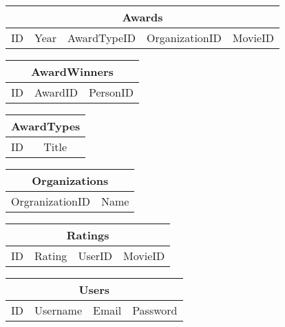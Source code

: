 \begin{tabular}{|l|l|l|l|l|}
\hline
\multicolumn{5}{|c|}{Awards} \\ \hline
ID & Year & AwardTypeID & OrganizationID & MovieID \\ \hline
\end{tabular}

\begin{tabular}{|l|l|l|}
\hline
\multicolumn{3}{|c|}{AwardWinners} \\ \hline
ID & AwardID & PersonID \\ \hline
\end{tabular}

\begin{tabular}{|l|l|}
\hline
\multicolumn{2}{|c|}{AwardTypes} \\ \hline
ID & Title \\ \hline
\end{tabular}

\begin{tabular}{|l|l|}
\hline
\multicolumn{2}{|c|}{Organizations} \\ \hline
OrgranizationID & Name \\ \hline
\end{tabular}

\begin{tabular}{|l|l|l|l|}
\hline
\multicolumn{4}{|c|}{Ratings} \\ \hline
ID & Rating & UserID & MovieID \\ \hline
\end{tabular}

\begin{tabular}{|l|l|l|l|}
\hline
\multicolumn{4}{|c|}{Users} \\ \hline
ID & Username & Email & Password \\ \hline
\end{tabular}

